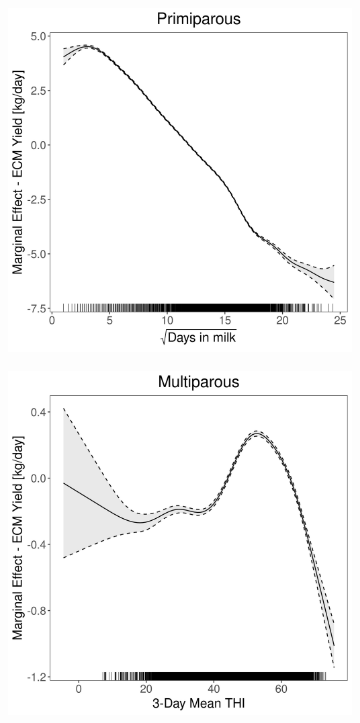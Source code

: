 \begin{figure}[H]
\begin{subfigure}[b]{0.45\textwidth}
    \end{subfigure}
    \hspace{0.05\textwidth} %
    \begin{subfigure}[b]{0.45\textwidth}
        \centering
        \includegraphics[width=\textwidth]{thesis/figures/models/ecm/full/si_ecm_full/si_ecm_full_marginal_dim_milk_primi.png}
    \end{subfigure}
    \begin{subfigure}[b]{0.45\textwidth}
        \centering
        \includegraphics[width=\textwidth]{thesis/figures/models/ecm/full/si_ecm_full/si_ecm_full_marginal_thi_milk_multi.png}

\end{subfigure}
\end{figure}

